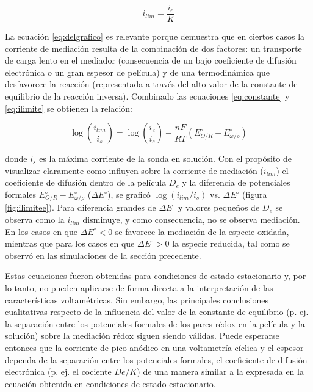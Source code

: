 		\begin{equation}
		i_{lim}=\frac{i_e}{K}
		\label{eq:ilimite}
		\end{equation}

		La ecuación \ref{eq:delgrafico} es relevante porque demuestra que en ciertos casos la corriente de mediación resulta de la combinación de dos factores: un transporte de carga lento en el mediador (consecuencia de un bajo coeficiente de difusión electrónica o un gran espesor de película) y de una termodinámica que desfavorece la reacción (representada a través del alto valor de la constante de equilibrio de la reacción inversa).\cite{ybarra2005}
		Combinado las ecuaciones \ref{eq:constante} y \ref{eq:ilimite} se obtienen la relación:

		\begin{equation}
			\log\left({\frac{i_{lim}}{i_s}}\right) =\log\left({\frac{i_e}{i_s}}\right)-{\frac{nF}{RT}}\left( E^{\circ}_{O/R} - E^{\circ}_{\omega / \rho} \right)
			\label{eq:delgrafico}
		\end{equation}

		\noindent donde $i_s$ es la máxima corriente de la sonda en solución. Con el propósito de visualizar claramente como influyen sobre la corriente de mediación ($i_{lim}$) el coeficiente de difusión dentro de la película $D_e$ y la diferencia de potenciales formales $E^{\circ}_{O/R} - E^{\circ}_{\omega / \rho}$ ($\Delta E^{\circ}$), se graficó $\log(i_{lim}/i_{s})$ vs. $\Delta E^{\circ}$ (figura \ref{fig:ilimitee}). Para diferencia grandes de $\Delta E^{\circ}$ y valores pequeños de $D_e$  se observa como la $i_{lim}$ disminuye, y como consecuencia, no se observa mediación. En los casos en que $\Delta E^{\circ}<0$ se favorece la mediación de la especie oxidada, mientras que para los casos en que $\Delta E^{\circ}>0$ la especie reducida, tal como se observó en las simulaciones de la sección precedente.\cite{ybarra2007}

		Estas ecuaciones fueron obtenidas para condiciones de estado estacionario y, por lo tanto, no pueden aplicarse de forma directa a la interpretación de las características voltamétricas. Sin embargo, las principales conclusiones cualitativas respecto de la influencia del valor de la constante de equilibrio (p. ej. la separación entre los potenciales formales de los pares rédox en la película y la solución) sobre la mediación rédox siguen siendo válidas. Puede esperarse entonces que la corriente de pico anódico en una voltametría cíclica y el espesor dependa de la separación entre los potenciales formales, el coeficiente de difusión electrónica (p. ej. el cociente $De/K$) de una manera similar a la expresada en la ecuación obtenida en condiciones de estado estacionario. 
		

